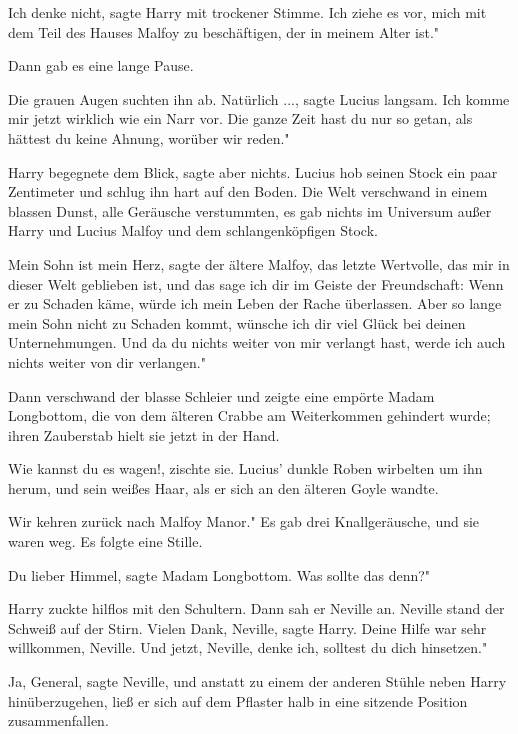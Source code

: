 \glqq{}Ich denke nicht\grqq{}, sagte Harry mit trockener Stimme. \glqq{}Ich
ziehe es vor, mich mit dem Teil des Hauses Malfoy zu beschäftigen, der in meinem
Alter ist."

Dann gab es eine lange Pause.

Die grauen Augen suchten ihn ab. \glqq{}Natürlich ...\grqq{}, sagte Lucius
langsam. \glqq{}Ich komme mir jetzt wirklich wie ein Narr vor. Die ganze Zeit
hast du nur so getan, als hättest du keine Ahnung, worüber wir reden."

Harry begegnete dem Blick, sagte aber nichts. Lucius hob seinen Stock ein paar
Zentimeter und schlug ihn hart auf den Boden. Die Welt verschwand in einem
blassen Dunst, alle Geräusche verstummten, es gab nichts im Universum außer
Harry und Lucius Malfoy und dem schlangenköpfigen Stock.

\glqq{}Mein Sohn ist mein Herz\grqq{}, sagte der ältere Malfoy, \glqq{}das
letzte Wertvolle, das mir in dieser Welt geblieben ist, und das sage ich dir im
Geiste der Freundschaft: Wenn er zu Schaden käme, würde ich mein Leben der Rache
überlassen. Aber so lange mein Sohn nicht zu Schaden kommt, wünsche ich dir viel
Glück bei deinen Unternehmungen. Und da du nichts weiter von mir verlangt hast,
werde ich auch nichts weiter von dir verlangen."

Dann verschwand der blasse Schleier und zeigte eine empörte Madam Longbottom,
die von dem älteren Crabbe am Weiterkommen gehindert wurde; ihren Zauberstab
hielt sie jetzt in der Hand.

\glqq{}Wie kannst du es wagen!\grqq{}, zischte sie. Lucius' dunkle Roben
wirbelten um ihn herum, und sein weißes Haar, als er sich an den älteren Goyle
wandte.

\glqq{}Wir kehren zurück nach Malfoy Manor." Es gab drei Knallgeräusche, und sie
waren weg. Es folgte eine Stille.

\glqq{}Du lieber Himmel\grqq{}, sagte Madam Longbottom. \glqq{}Was sollte das
denn?"

Harry zuckte hilflos mit den Schultern. Dann sah er Neville an. Neville stand
der Schweiß auf der Stirn. \glqq{}Vielen Dank, Neville\grqq{}, sagte Harry.
\glqq{}Deine Hilfe war sehr willkommen, Neville. Und jetzt, Neville, denke ich,
solltest du dich hinsetzen."

\glqq{}Ja, General\grqq{}, sagte Neville, und anstatt zu einem der anderen
Stühle neben Harry hinüberzugehen, ließ er sich auf dem Pflaster halb in eine
sitzende Position zusammenfallen.

